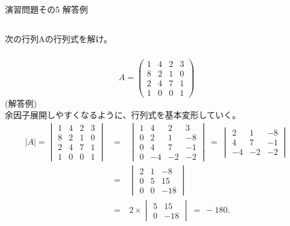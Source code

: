 \documentclass[a4paper,11pt,fleqn]{jarticle}
\begin{document}
\begin{center}
\begin{Large}
演習問題その5 解答例
\end{Large}
\end{center}

\subsection{}
次の行列Aの行列式を解け。
\subsubsection{}
\begin{equation*}
A=
\begin{pmatrix}
1 &4 &2 &3 \\
8 &2 &1 &0 \\
2 &4 &7 &1 \\
1 &0 &0 &1
\end{pmatrix}
\end{equation*}
(解答例)\\
余因子展開しやすくなるように、行列式を基本変形していく。
\begin{eqnarray*}
|A|=
\begin{vmatrix}
1 &4 &2 &3 \\
8 &2 &1 &0 \\
2 &4 &7 &1 \\
1 &0 &0 &1
\end{vmatrix}
&~=~& \begin{vmatrix}
1 &4 &2 &3 \\
0 &2 &1 &-8 \\
0 &4 &7 &-1 \\
0 &-4 &-2 &-2
\end{vmatrix}
~=~ \begin{vmatrix}
2 &1 &-8 \\
4 &7 &-1 \\
-4 &-2 &-2
\end{vmatrix}\\
&~=~& \begin{vmatrix}
2 &1 &-8 \\
0 &5 &15 \\
0 &0 &-18
\end{vmatrix}\\
&~=~& 2\times \begin{vmatrix}
5 &15 \\
0 &-18
\end{vmatrix} ~=~ -180.
\end{eqnarray*}
\end{document}
